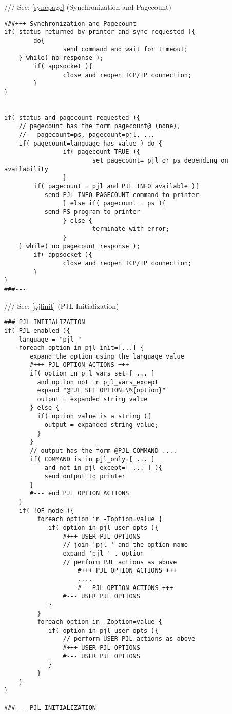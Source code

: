 \documentclass[a4paper]{article}
\begin{document}
{\ttfamily ///} See: \ref{syncpage} {(Synchronization and Pagecount)}
\begin{tscreen}
\begin{verbatim}
###+++ Synchronization and Pagecount
if( status returned by printer and sync requested ){
        do{
                send command and wait for timeout;
    } while( no response );
        if( appsocket ){
                close and reopen TCP/IP connection;
        }
}


if( status and pagecount requested ){
    // pagecount has the form pagecount@ (none),
    //   pagecount=ps, pagecount=pjl, ...
    if( pagecount=language has value ) do {
                if( pagecount TRUE ){
                        set pagecount= pjl or ps depending on availability
                }
        if( pagecount = pjl and PJL INFO available ){
           send PJL INFO PAGECOUNT command to printer
                } else if( pagecount = ps ){
           send PS program to printer
                } else {
                        terminate with error;
                }
    } while( no pagecount response );
        if( appsocket ){
                close and reopen TCP/IP connection;
        }
}
###---
\end{verbatim}
\end{tscreen}

{\ttfamily ///} See: \ref{pjlinit} {(PJL Initialization)}
\begin{tscreen}
\begin{verbatim}
### PJL INITIALIZATION
if( PJL enabled ){
    language = "pjl_"
    foreach option in pjl_init=[...] {
       expand the option using the language value
       #+++ PJL OPTION ACTIONS +++
       if( option in pjl_vars_set=[ ... ]
         and option not in pjl_vars_except
         expand "@PJL SET OPTION=\%{option}"
         output = expanded string value
       } else {
         if( option value is a string ){
           output = expanded string value;
         }
       }
       // output has the form @PJL COMMAND ....
       if( COMMAND is in pjl_only=[ ... ]
           and not in pjl_except=[ ... ] ){
           send output to printer
       }
       #--- end PJL OPTION ACTIONS
    }
    if( !OF_mode ){
         foreach option in -Toption=value {
            if( option in pjl_user_opts ){
                #+++ USER PJL OPTIONS
                // join 'pjl_' and the option name
                expand 'pjl_' . option
                // perform PJL actions as above
                    #+++ PJL OPTION ACTIONS +++
                    ....
                    #-- PJL OPTION ACTIONS +++
                #--- USER PJL OPTIONS
            }
         }
         foreach option in -Zoption=value {
            if( option in pjl_user_opts ){
                // perform USER PJL actions as above
                #+++ USER PJL OPTIONS
                #--- USER PJL OPTIONS
            }
         }
    }
}

###--- PJL INITIALIZATION
\end{verbatim}
\end{tscreen}
\end{document}
